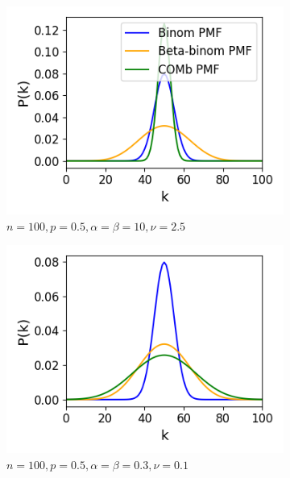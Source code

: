 \documentclass[a4paper,12pt]{article}
\theoremstyle{definition}
\begin{document}
      \begin{figure}[h]
        \begin{subfigure}[h]{0.5\linewidth}
          \includegraphics[width=\textwidth]{figures/comb_underdispersion.png}
          \caption{$n=100, p=0.5, \alpha=\beta=10, \nu=2.5$}
          \label{fig:comb_underdispersion}
        \end{subfigure}
        \begin{subfigure}[h]{0.5\linewidth}
          \includegraphics[width=\textwidth]{figures/comb_overrdispersion.png}
          \caption{$n=100, p=0.5, \alpha=\beta=0.3, \nu=0.1$}
          \label{fig:comb_overrdispersion}
        \end{subfigure}
        \begin{subfigure}[h]{0.5\linewidth}

\end{subfigure}
\end{figure}
\end{document}

